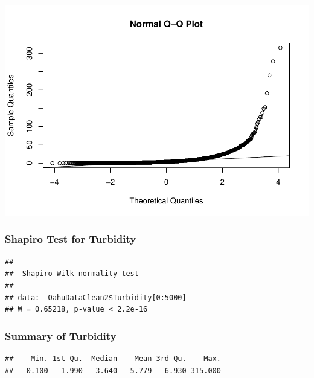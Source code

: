 \documentclass[12pt,]{article}
\newenvironment{Shaded}{\begin{snugshade}}{\end{snugshade}}
\newcommand{\KeywordTok}[1]{\textcolor[rgb]{0.13,0.29,0.53}{\textbf{#1}}}
\newcommand{\DecValTok}[1]{\textcolor[rgb]{0.00,0.00,0.81}{#1}}
\newcommand{\OperatorTok}[1]{\textcolor[rgb]{0.81,0.36,0.00}{\textbf{#1}}}
\newcommand{\NormalTok}[1]{#1}
\begin{document}
\includegraphics{Garcia_ENV872_Project_files/figure-latex/unnamed-chunk-41-1.pdf}

\subsubsection{Shapiro Test for
Turbidity}\label{shapiro-test-for-turbidity}

\begin{Shaded}
\end{Shaded}

\begin{verbatim}
## 
##  Shapiro-Wilk normality test
## 
## data:  OahuDataClean2$Turbidity[0:5000]
## W = 0.65218, p-value < 2.2e-16
\end{verbatim}

\subsubsection{Summary of Turbidity}\label{summary-of-turbidity}

\begin{Shaded}
\end{Shaded}

\begin{verbatim}
##    Min. 1st Qu.  Median    Mean 3rd Qu.    Max. 
##   0.100   1.990   3.640   5.779   6.930 315.000
\end{verbatim}
\end{document}
